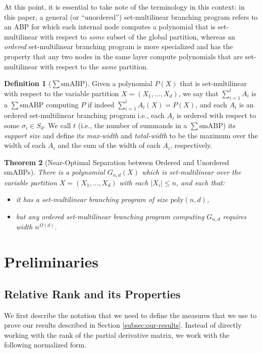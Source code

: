 \documentclass[10pt,a4paper]{article}
\newtheorem{theorem}{Theorem}[section]
\theoremstyle{definition}%
\newtheorem{definition}[theorem]{Definition}
\theoremstyle{plain}
\newcommand{\sbp}{\sum\mathrm{smABP}}
\newcommand{\poly}{\mathrm{poly}}
\begin{document}
At this point, it is essential to take note of the terminology in this context: in this paper, a general (or ``unordered'') set-multilinear branching program refers to an ABP for which each internal node computes a polynomial that is set-multilinear with respect to \emph{some} subset of the global partition, whereas an \emph{ordered} set-multilinear branching program is more specialized and has the property that any two nodes in the same layer compute polynomials that are set-multilinear with respect to the \emph{same} partition.

\begin{definition}[$\sbp$]\label{def:sum}
Given a polynomial $P(X)$ that is set-multilinear with respect to the variable partition $X = (X_1,\ldots, X_d)$, we say that $\sum_{i=1}^t A_i$ is a $\sbp$ computing $P$ if indeed $\sum_{i=1}^t A_i(X) = P(X)$, and
each $A_i$ is an ordered set-multilinear branching program i.e., each $A_i$ is ordered with respect to some $\sigma_i\in S_d$. We call $t$ (i.e., the number of summands in a $\sbp$) its \emph{support size} and define its \emph{max-width} and \emph{total-width} to be the maximum over the width of each $A_i$ and the sum of the width of each $A_i$, respectively.    
\end{definition}

\begin{theorem}[Near-Optimal Separation between Ordered and Unordered smABPs]\label{thm:sep-ord-unord}
    There is a polynomial $G_{n,d}(X)$ which is set-multilinear over the variable partition $X = (X_1,\ldots,X_d)$ with
each $|X_i| \leq n$, and such that:
\begin{itemize}
    \item it has a set-multilinear branching program of size $\poly(n,d)$,
    \item but any ordered set-multilinear branching program computing $G_{n,d}$ requires width $n^{\Omega(d)}$. 
\end{itemize}
\end{theorem}

\section{Preliminaries}\label{sec:prel}
\subsection{Relative Rank and its Properties}

We first describe the notation that we need to define the measures that we use to prove our results described in Section \ref{subsec:our-results}. Instead of directly working with the rank of the partial derivative matrix, we work with the following normalized form.
\end{document}

